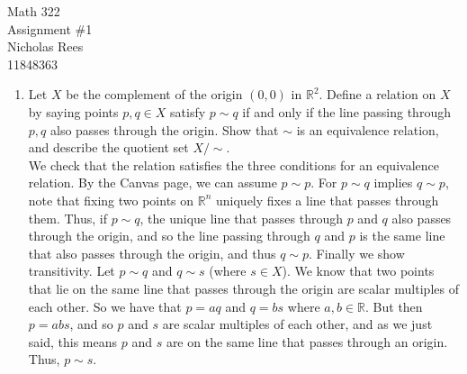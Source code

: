 \documentclass{article}
\newcommand{\R}{{\mathbb R}}
\begin{document}
\noindent Math 322\\
Assignment \#1\\
Nicholas Rees\\
11848363

\begin{enumerate}
	\item Let $X$ be the complement of the origin $(0,0)$ in $\R^2$.
		Define a relation on $X$ by saying points $p,q \in X$ satisfy
		$p \sim q$ if and only if the line passing through
		$p, q$ also passes through the origin.
		Show that $\sim$ is an equivalence relation,
		and describe the quotient set $X /\sim$.\\
		We check that the relation satisfies the three conditions
		for an equivalence relation.
		By the Canvas page, we can assume $p \sim p$.
		For $p \sim q$ implies $q \sim p$,
		note that fixing two points on $\R^n$
		uniquely fixes a line that passes through them.
		Thus, if $p \sim q$,
		the unique line that passes through $p$ and $q$
		also passes through the origin,
		and so the line passing through $q$ and $p$ is the same line
		that also passes through the origin,
		and thus $q \sim p$.
		Finally we show transitivity.
		Let $p \sim q$ and $q \sim s$ (where $s \in X$).
		We know that two points that lie on the same line
		that passes through the origin are scalar multiples of each other.
		So we have that $p = aq$ and $q = bs$ where $a,b \in \R$.
		But then $p = abs$, and so $p$ and $s$ are scalar multiples of each other,
		and as we just said, this means $p$ and $s$
		are on the same line that passes through an origin.
		Thus, $p \sim s$.


\end{enumerate}
\end{document}

